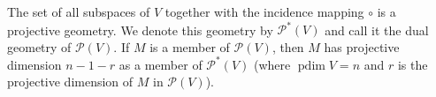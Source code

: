 The set of all subspaces of $V$ together with the incidence mapping $\circ$ is a projective geometry. We denote this geometry by $\mathcal{P}^*(V)$ and call it the dual geometry of $\mathcal{P}(V)$. If $M$ is a member of $\mathcal{P}(V)$, then $M$ has projective dimension $n-1-r$ as a member of $\mathcal{P}^*(V)$ (where $\operatorname{pdim} V = n$ and $r$ is the projective dimension of $M$ in $\mathcal{P}(V)$).
